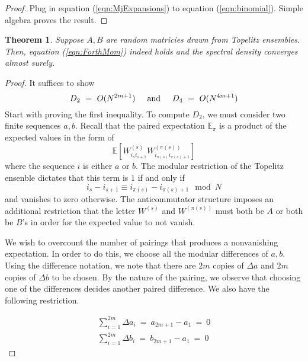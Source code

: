 \documentclass{article}
\newcommand{\textAnd}{
    {
        \hspace{5mm}
        \textrm{and}
        \hspace{5mm}
    }
}
\newtheorem{theorem}{Theorem}
\newcommand{\E}{\mathbb{E}}
\begin{document}
\begin{proof}
    Plug in equation (\ref{eqn:MjExpansions}) to equation (\ref{eqn:binomial}). 
    Simple algebra proves the result. 
\end{proof}

\begin{theorem}\label{thm:PTPTcvg}
    Suppose $A, B$ are random matricies drawn from Topelitz 
    ensembles. Then, equation (\ref{eqn:ForthMom}) indeed holds and 
    the spectral density converges almost surely. 
\end{theorem}

\begin{proof}
    It suffices to show 
    \begin{equation}
        D_2 \ = \ O(N^{2m + 1})
        \textAnd 
        D_4 \ = \ O(N^{4m + 1})
    \end{equation}
    Start with proving the first inequality. To compute $D_2$, we must consider 
    two finite sequences $a, b$. 
    Recall that the paired 
    expectation $\E_\pi$ is a product of the expected values in the form of 
    \begin{equation}
        \E[W_{i_si_{s + 1}}^{(s)} W_{i_{\pi(s)}i_{\pi(s) + 1}}^{(\pi(s))}] 
    \end{equation}
    where the sequence $i$ is either $a$ or $b$. 
    The modular restriction of the Topelitz ensenble dictates 
    that this term is $1$ if and only if 
    \begin{equation}
        i_s - i_{s + 1} \equiv i_{\pi(s)} - i_{\pi(s) + 1} \mod N
    \end{equation}
    and vanishes to zero otherwise. The anticommutator structure 
    imposes an additional restriction that the letter $W^{(s)}$ and 
    $W^{(\pi(s))}$ must both be $A$ or both be $B$'s in order for the expected 
    value to not vanish. 

    We wish to overcount the number of pairings that produces 
    a nonvanishing expectation. In order to do this, we choose 
    all the modular differences of $a, b$. Using the difference 
    notation, we note that there are $2m$ copies of $\Delta a$ 
    and $2m$ copies of $\Delta b$ to be chosen. By the nature 
    of the pairing, we observe that choosing one of the 
    differences decides another paired difference. We also have 
    the following restriction. 

    \begin{eqnarray} \label{eqn:ModRestr}
        \sum_{i = 1}^{2m} \Delta a_i \ = \ a_{2m + 1} - a_1 \ =\ 0 \nonumber \\
        \sum_{i = 1}^{2m} \Delta b_i \ = \ b_{2m + 1} - a_1 \ =\ 0 
    \end{eqnarray}


\end{proof}
\end{document}
